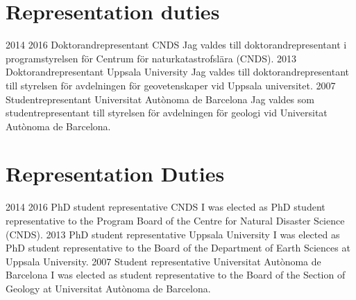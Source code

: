 \ifswedish
  \section{Representation duties}
    \position
      {2014 \textemdash{} 2016}
      {Doktorandrepresentant}
      {CNDS}
      {Jag valdes till doktorandrepresentant i programstyrelsen för Centrum för naturkatastrofslära (CNDS).}
    \position
      {2013}
      {Doktorandrepresentant}
      {Uppsala University}
      {Jag valdes till doktorandrepresentant till styrelsen för avdelningen för geovetenskaper vid Uppsala universitet.}
    \position
      {2007}
      {Studentrepresentant}
      {Universitat Autònoma de Barcelona}
      {Jag valdes som studentrepresentant till styrelsen för avdelningen för geologi vid Universitat Autònoma de Barcelona.}
\else
  \section{Representation Duties}
    \position
      {2014 \textemdash{} 2016}
      {PhD student representative}
      {CNDS}
      {I was elected as PhD student representative to the Program Board of the Centre for Natural Disaster Science (CNDS).}
    \position
      {2013}
      {PhD student representative}
      {Uppsala University}
      {I was elected as PhD student representative to the Board of the Department of Earth Sciences at Uppsala University.}
    \position
      {2007}
      {Student representative}
      {Universitat Autònoma de Barcelona}
      {I was elected as student representative to the Board of the Section of Geology at Universitat Autònoma de Barcelona.}
\fi
